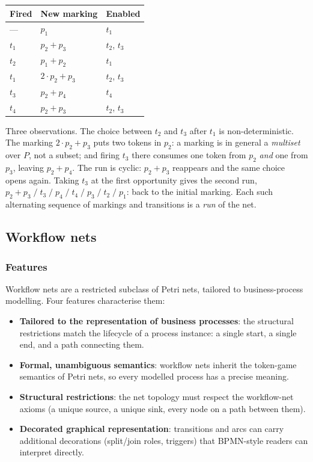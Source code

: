 \begin{center}\small
\begin{tabular}{lll}
\toprule
\textbf{Fired} & \textbf{New marking} & \textbf{Enabled} \\
\midrule
--- & $p_1$ & $t_1$ \\
$t_1$ & $p_2+p_3$ & $t_2$, $t_3$ \\
$t_2$ & $p_1+p_2$ & $t_1$ \\
$t_1$ & $2\cdot p_2+p_3$ & $t_2$, $t_3$ \\
$t_3$ & $p_2+p_4$ & $t_4$ \\
$t_4$ & $p_2+p_3$ & $t_2$, $t_3$ \\
\bottomrule
\end{tabular}
\end{center}

Three observations. The choice between $t_2$ and $t_3$ after $t_1$ is non-deterministic. The marking $2\cdot p_2+p_3$ puts two tokens in $p_2$: a marking is in general a \emph{multiset} over $P$, not a subset; and firing $t_3$ there consumes one token from $p_2$ \emph{and} one from $p_3$, leaving $p_2+p_4$. The run is cyclic: $p_2+p_3$ reappears and the same choice opens again. Taking $t_3$ at the first opportunity gives the second run, $p_2+p_3 \;/\; t_3 \;/\; p_4 \;/\; t_4 \;/\; p_3 \;/\; t_2 \;/\; p_1$: back to the initial marking. Each such alternating sequence of markings and transitions is a \emph{run} of the net.

\subsection{Workflow nets}

\subsubsection{Features}

Workflow nets are a restricted subclass of Petri nets, tailored to business-process modelling. Four features characterise them:

\begin{itemize}
  \item \textbf{Tailored to the representation of business processes}: the structural restrictions match the lifecycle of a process instance: a single start, a single end, and a path connecting them.
  \item \textbf{Formal, unambiguous semantics}: workflow nets inherit the token-game semantics of Petri nets, so every modelled process has a precise meaning.
  \item \textbf{Structural restrictions}: the net topology must respect the workflow-net axioms (a unique source, a unique sink, every node on a path between them).
  \item \textbf{Decorated graphical representation}: transitions and arcs can carry additional decorations (split/join roles, triggers) that BPMN-style readers can interpret directly.
\end{itemize}


